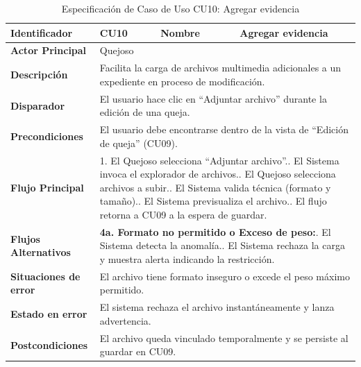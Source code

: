 \vspace{0.8cm}

\begingroup
\setlength{\parskip}{0pt}
\begin{longtable}{|p{3.5cm}|p{2cm}|p{2.5cm}|p{7cm}|}
\caption{Especificación de Caso de Uso CU10: Agregar evidencia}
\label{tab:cu10_agregar_evidencia} \\
\hline
\textbf{Identificador} & CU10 & \textbf{Nombre} & Agregar evidencia \\ \hline
\textbf{Actor Principal} & \multicolumn{3}{p{11.5cm}|}{Quejoso} \\ \hline
\textbf{Descripción} & \multicolumn{3}{p{11.5cm}|}{Facilita la carga de archivos multimedia adicionales a un expediente en proceso de modificación.} \\ \hline
\textbf{Disparador} & \multicolumn{3}{p{11.5cm}|}{El usuario hace clic en ``Adjuntar archivo'' durante la edición de una queja.} \\ \hline
\textbf{Precondiciones} & \multicolumn{3}{p{11.5cm}|}{El usuario debe encontrarse dentro de la vista de ``Edición de queja'' (CU09).} \\ \hline
\textbf{Flujo Principal} & \multicolumn{3}{p{11.5cm}|}{1. El Quejoso selecciona ``Adjuntar archivo''.\newline 2. El Sistema invoca el explorador de archivos.\newline 3. El Quejoso selecciona archivos a subir.\newline 4. El Sistema valida técnica (formato y tamaño).\newline 5. El Sistema previsualiza el archivo.\newline 6. El flujo retorna a CU09 a la espera de guardar.} \\ \hline
\textbf{Flujos Alternativos} & \multicolumn{3}{p{11.5cm}|}{\textbf{4a. Formato no permitido o Exceso de peso:}\newline 1. El Sistema detecta la anomalía.\newline 2. El Sistema rechaza la carga y muestra alerta indicando la restricción.} \\ \hline
\textbf{Situaciones de error} & \multicolumn{3}{p{11.5cm}|}{El archivo tiene formato inseguro o excede el peso máximo permitido.} \\ \hline
\textbf{Estado en error} & \multicolumn{3}{p{11.5cm}|}{El sistema rechaza el archivo instantáneamente y lanza advertencia.} \\ \hline
\textbf{Postcondiciones} & \multicolumn{3}{p{11.5cm}|}{El archivo queda vinculado temporalmente y se persiste al guardar en CU09.} \\ \hline
\end{longtable}
\endgroup

